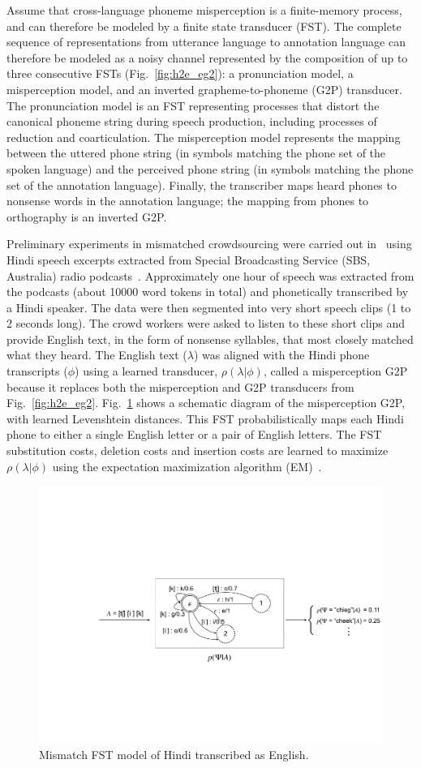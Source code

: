 Assume that cross-language phoneme misperception is a finite-memory
process, and can therefore be modeled by a finite state transducer
(FST).  The complete sequence of representations from utterance
language to annotation language can therefore be modeled as a noisy
channel represented by the composition of up to three consecutive FSTs
(Fig.~\ref{fig:h2e_eg2}): a pronunciation model, a misperception
model, and an inverted grapheme-to-phoneme (G2P) transducer.  The
pronunciation model is an FST representing processes that distort the
canonical phoneme string during speech production, including processes
of reduction and coarticulation.  The misperception model represents
the mapping between the uttered phone string (in symbols matching the
phone set of the spoken language) and the perceived phone string (in
symbols matching the phone set of the annotation language).  Finally,
the transcriber maps heard phones to nonsense words in the annotation
language; the mapping from phones to orthography is an inverted G2P.

Preliminary experiments in mismatched crowdsourcing were carried out
in~\cite{JHJ15a} using Hindi speech excerpts extracted from Special
Broadcasting Service (SBS, Australia) radio podcasts~\cite{SBS}.
Approximately one hour of speech was extracted from the podcasts
(about 10000 word tokens in total) and phonetically transcribed by a
Hindi speaker. The data were then segmented into very short speech
clips (1 to 2 seconds long). The crowd workers were asked to listen to
these short clips and provide English text, in the form of nonsense
syllables, that most closely matched what they heard. The English text
($\lambda$) was aligned with the Hindi phone transcripts ($\phi$)
using a learned transducer, $\rho(\lambda|\phi)$, called a
misperception G2P because it replaces both the misperception and G2P
transducers from Fig.~\ref{fig:h2e_eg2}.  Fig.~\ref{fig:channelfst}
shows a schematic diagram of the misperception G2P, with learned
Levenshtein distances. This FST probabilistically maps each Hindi
phone to either a single English letter or a pair of English
letters. The FST substitution costs, deletion costs and insertion
costs are learned to maximize $\rho(\lambda|\phi)$ using the expectation
maximization algorithm (EM)~\cite{Dempster77}.

\begin{figure}[b!]
\centering
\includegraphics[width=\linewidth]{../figs/mismatchfst.pdf}
\caption{Mismatch FST model of Hindi transcribed as English.\label{fig:channelfst}}
\end{figure}

